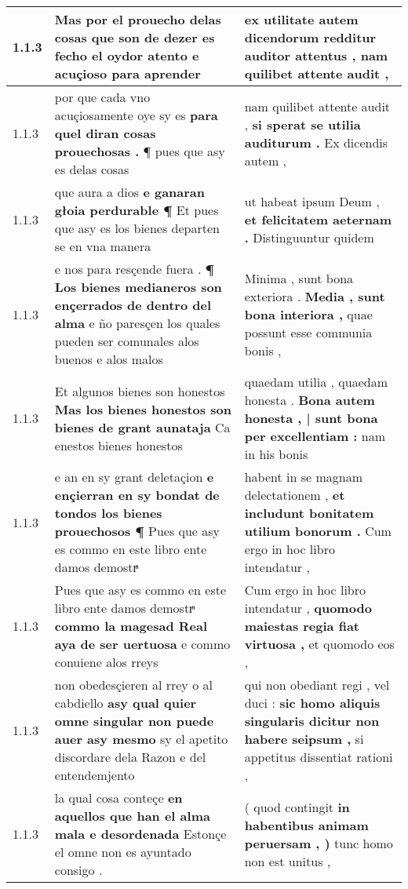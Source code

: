 \begin{tabular}{|p{1cm}|p{6.5cm}|p{6.5cm}|}
1.1.3 & Mas por el prouecho delas cosas \textbf{ que son de dezer es fecho el oydor atento e acuçioso } para aprender & ex utilitate autem dicendorum \textbf{ redditur auditor attentus , } nam quilibet attente audit , \\\hline
1.1.3 & por que cada vno acuçiosamente oye sy es \textbf{ para quel diran cosas prouechosas . } ¶ pues que asy es delas cosas & nam quilibet attente audit , \textbf{ si sperat se utilia auditurum . } Ex dicendis autem , \\\hline
1.1.3 & que aura a dios \textbf{ e ganaran głoia perdurable ¶ } Et pues que asy es los bienes departen se en vna manera & ut habeat ipsum Deum , \textbf{ et felicitatem aeternam . } Distinguuntur quidem \\\hline
1.1.3 & e nos para resçende fuera . \textbf{ ¶ Los bienes medianeros son ençerrados de dentro del alma } e ño paresçen los quales pueden ser comunales alos buenos e alos malos & Minima , sunt bona exteriora . \textbf{ Media , sunt bona interiora , } quae possunt esse communia bonis , \\\hline
1.1.3 & Et algunos bienes son honestos \textbf{ Mas los bienes honestos son bienes de grant aunataja } Ca enestos bienes honestos & quaedam utilia , quaedam honesta . \textbf{ Bona autem honesta , | sunt bona per excellentiam : } nam in his bonis \\\hline
1.1.3 & e an en sy grant deletaçion \textbf{ e ençierran en sy bondat de tondos los bienes prouechosos ¶ } Pues que asy es commo en este libro ente damos demostrͣ & habent in se magnam delectationem , \textbf{ et includunt bonitatem utilium bonorum . } Cum ergo in hoc libro intendatur , \\\hline
1.1.3 & Pues que asy es commo en este libro ente damos demostrͣ \textbf{ commo la magesad Real aya de ser uertuosa } e commo conuiene alos rreys & Cum ergo in hoc libro intendatur , \textbf{ quomodo maiestas regia fiat virtuosa , } et quomodo eos , \\\hline
1.1.3 & non obedesçieren al rrey o al cabdiello \textbf{ asy qual quier omne singular non puede auer asy mesmo } sy el apetito discordare dela Razon e del entendemjento & qui non obediant regi , vel duci : \textbf{ sic homo aliquis singularis dicitur non habere seipsum , } si appetitus dissentiat rationi , \\\hline
1.1.3 & la qual cosa conteçe \textbf{ en aquellos que han el alma mala e desordenada } Estonçe el omne non es ayuntado consigo . & ( quod contingit \textbf{ in habentibus animam peruersam , ) } tunc homo non est unitus , \\\hline

\end{tabular}
